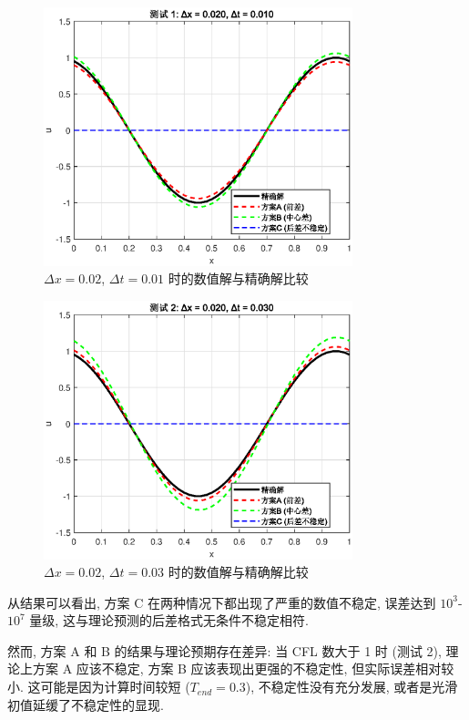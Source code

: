 \documentclass[12pt]{article}
\begin{document}
\begin{figure}[H]
\centering
\includegraphics[width=0.8\textwidth]{fig/result_001.eps}
\caption{$\Delta x = 0.02$, $\Delta t = 0.01$ 时的数值解与精确解比较}
\end{figure}

\begin{figure}[H]
\centering
\includegraphics[width=0.8\textwidth]{fig/result_003.eps}
\caption{$\Delta x = 0.02$, $\Delta t = 0.03$ 时的数值解与精确解比较}
\end{figure}

从结果可以看出, 方案 C 在两种情况下都出现了严重的数值不稳定, 误差达到 $10^3$-$10^7$ 量级, 这与理论预测的后差格式无条件不稳定相符. 

然而, 方案 A 和 B 的结果与理论预期存在差异: 当 CFL 数大于 1 时 (测试 2), 理论上方案 A 应该不稳定, 方案 B 应该表现出更强的不稳定性, 但实际误差相对较小. 这可能是因为计算时间较短 ($T_{end} = 0.3$), 不稳定性没有充分发展, 或者是光滑初值延缓了不稳定性的显现.
\end{document}
